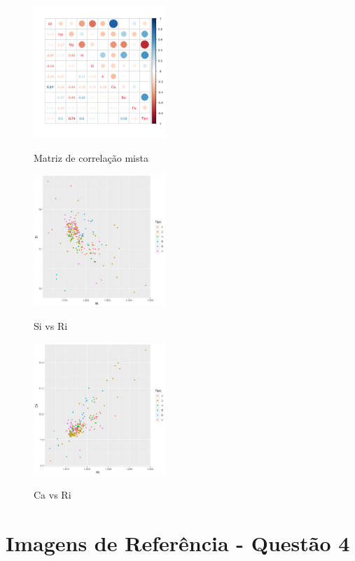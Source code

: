 \documentclass[conference]{IEEEtran}
\begin{document}
\begin{figure}[h]
\caption{Matriz de correlação mista}
\centering %
\includegraphics[width=5cm]{images/pt3/Matriz_Correlacao_mixed.png} %
\label{figura:histogramaal}
\end{figure}


\begin{figure}[h]
\caption{Si vs Ri}
\centering %
\includegraphics[width=5cm]{images/pt3/scatterplot_si_vs_ri.png} %
\label{figura:histogramaal}
\end{figure}


\begin{figure}[h]
\caption{Ca vs Ri}
\centering %
\includegraphics[width=5cm]{images/pt3/scatterplot_ca_vs_ri.png} %
\label{figura:histogramaal}
\end{figure}


\newpage %
\section{Imagens de Referência - Questão 4}
\end{document}
